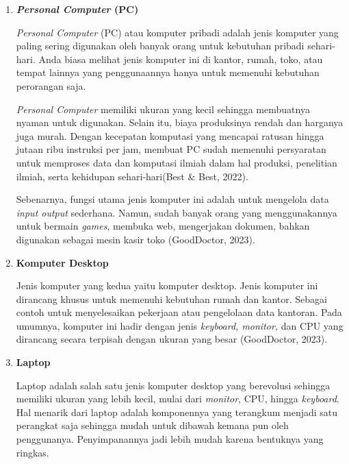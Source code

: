 \documentclass[12pt]{article}
\begin{document}
\begin{enumerate}
    \item \textbf{\textit{Personal Computer} (PC)}
    
    \hspace{0.61cm}\textit{Personal Computer} (PC) atau komputer pribadi adalah jenis komputer yang paling sering digunakan oleh banyak orang untuk kebutuhan pribadi sehari-hari. Anda biasa melihat jenis komputer ini di kantor, rumah, toko, atau tempat lainnya yang penggunaannya hanya untuk memenuhi kebutuhan perorangan saja. 

    \hspace{0.61cm}\textit{Personal Computer} memiliki ukuran yang kecil sehingga membuatnya nyaman untuk digunakan. Selain itu, biaya produksinya rendah dan harganya juga murah. Dengan kecepatan komputasi yang mencapai ratusan hingga jutaan ribu instruksi per jam, membuat PC sudah memenuhi persyaratan untuk memproses data dan komputasi ilmiah dalam hal produksi, penelitian ilmiah, serta kehidupan sehari-hari(Best & Best, 2022). 

    \hspace{0.61cm}Sebenarnya, fungsi utama jenis komputer ini adalah untuk mengelola data \textit{input output} sederhana. Namun, sudah banyak orang yang menggunakannya untuk bermain \textit{games}, membuka web, mengerjakan dokumen, bahkan digunakan sebagai mesin kasir toko (GoodDoctor, 2023). 
    
    \item \textbf{Komputer Desktop}

    \hspace{0.61cm}Jenis komputer yang kedua yaitu komputer desktop. Jenis komputer ini dirancang khusus untuk memenuhi kebutuhan rumah dan kantor. Sebagai contoh untuk menyelesaikan pekerjaan atau pengelolaan data kantoran. Pada umumnya, komputer ini hadir dengan jenis \textit{keyboard, monitor,} dan CPU yang dirancang secara terpisah dengan ukuran yang besar (GoodDoctor, 2023). 
    
    \item \textbf{Laptop}
    
    \hspace{0.61cm}Laptop adalah salah satu jenis komputer desktop yang berevolusi sehingga memiliki ukuran yang lebih kecil, mulai dari \textit{monitor}, CPU, hingga \textit{keyboard}. Hal menarik dari laptop adalah komponennya yang terangkum menjadi satu perangkat saja sehingga mudah untuk dibawah kemana pun oleh penggunanya. Penyimpanannya jadi lebih mudah karena bentuknya yang ringkas. 


\end{enumerate}
\end{document}
